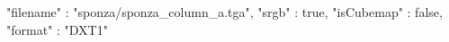 { 
	"filename" : "sponza/sponza_column_a.tga", 
	"srgb" : true,
	"isCubemap" : false,
	"format" : "DXT1"
}